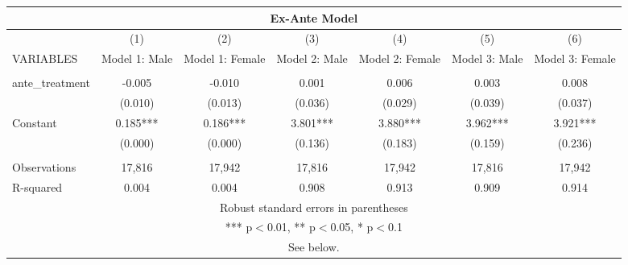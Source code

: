 \begin{tabular}{lcccccc}
\multicolumn{7}{c}{Ex-Ante Model} \\ \hline
 & (1) & (2) & (3) & (4) & (5) & (6) \\
VARIABLES & Model 1: Male & Model 1: Female & Model 2: Male & Model 2: Female & Model 3: Male & Model 3: Female \\ \hline
 &  &  &  &  &  &  \\
ante\_treatment & -0.005 & -0.010 & 0.001 & 0.006 & 0.003 & 0.008 \\
 & (0.010) & (0.013) & (0.036) & (0.029) & (0.039) & (0.037) \\
Constant & 0.185*** & 0.186*** & 3.801*** & 3.880*** & 3.962*** & 3.921*** \\
 & (0.000) & (0.000) & (0.136) & (0.183) & (0.159) & (0.236) \\
 &  &  &  &  &  &  \\
Observations & 17,816 & 17,942 & 17,816 & 17,942 & 17,816 & 17,942 \\
 R-squared & 0.004 & 0.004 & 0.908 & 0.913 & 0.909 & 0.914 \\ \hline
\multicolumn{7}{c}{ Robust standard errors in parentheses} \\
\multicolumn{7}{c}{ *** p$<$0.01, ** p$<$0.05, * p$<$0.1} \\
\multicolumn{7}{c}{ See below.} \\
\end{tabular}
